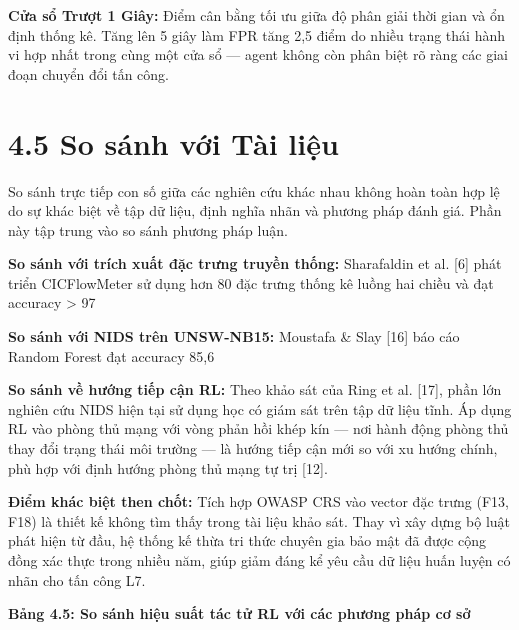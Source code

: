 \documentclass[12pt,a4paper,twoside]{report}
\begin{document}
{{{{{{{{\textbf{Cửa sổ Trượt 1 Giây:} Điểm cân bằng tối ưu giữa độ phân giải thời gian và ổn định thống kê. Tăng lên 5 giây làm FPR tăng 2,5 điểm do nhiều trạng thái hành vi hợp nhất trong cùng một cửa sổ — agent không còn phân biệt rõ ràng các giai đoạn chuyển đổi tấn công.


\section{4.5 So sánh với Tài liệu}

So sánh trực tiếp con số giữa các nghiên cứu khác nhau không hoàn toàn hợp lệ do sự khác biệt về tập dữ liệu, định nghĩa nhãn và phương pháp đánh giá. Phần này tập trung vào so sánh phương pháp luận.

\textbf{So sánh với trích xuất đặc trưng truyền thống:} Sharafaldin et al. [6] phát triển CICFlowMeter sử dụng hơn 80 đặc trưng thống kê luồng hai chiều và đạt accuracy > 97%

\textbf{So sánh với NIDS trên UNSW-NB15:} Moustafa & Slay [16] báo cáo Random Forest đạt accuracy 85,6%

\textbf{So sánh về hướng tiếp cận RL:} Theo khảo sát của Ring et al. [17], phần lớn nghiên cứu NIDS hiện tại sử dụng học có giám sát trên tập dữ liệu tĩnh. Áp dụng RL vào phòng thủ mạng với vòng phản hồi khép kín — nơi hành động phòng thủ thay đổi trạng thái môi trường — là hướng tiếp cận mới so với xu hướng chính, phù hợp với định hướng phòng thủ mạng tự trị [12].

\textbf{Điểm khác biệt then chốt:} Tích hợp OWASP CRS vào vector đặc trưng (F13, F18) là thiết kế không tìm thấy trong tài liệu khảo sát. Thay vì xây dựng bộ luật phát hiện từ đầu, hệ thống kế thừa tri thức chuyên gia bảo mật đã được cộng đồng xác thực trong nhiều năm, giúp giảm đáng kể yêu cầu dữ liệu huấn luyện có nhãn cho tấn công L7.

\textbf{Bảng 4.5: So sánh hiệu suất tác tử RL với các phương pháp cơ sở}

}}}}}}}}
\end{document}

